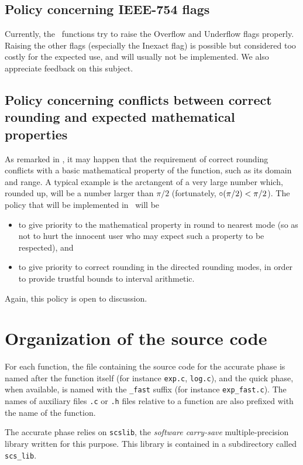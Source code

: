 \subsection{Policy concerning IEEE-754 flags}

Currently, the \crlibm\ functions try to raise the Overflow and
Underflow flags properly. Raising the other flags (especially the
Inexact flag) is possible but considered too costly for the expected
use, and will usually not be implemented. We also appreciate feedback
on this subject.

\subsection{Policy concerning conflicts between correct rounding and
  expected mathematical properties}
As remarked in \cite{DefHanLefMulRevZim2004}, it may happen that the
requirement of correct rounding conflicts with a basic mathematical
property of the function, such as its domain and range. A typical
example is the arctangent of a very large number which, rounded up,
will be a number larger than $\pi/2$ (fortunately, $\circ(\pi/2) <
\pi/2$). The policy that will be implemented in \crlibm\ will be
\begin{itemize}
\item to give priority to the mathematical property in round to
  nearest mode (so as not to hurt the innocent user who may expect
  such a property to be respected), and 
\item to give priority to correct rounding in the directed rounding
  modes, in order to provide trustful bounds to interval arithmetic.
\end{itemize}

Again, this policy is open to discussion.

\section{Organization of the source code}

For each function, the file containing the source code for the
accurate phase is named after the function itself (for instance
\texttt{exp.c}, \texttt{log.c}), and the quick phase, when available,
is named with the \texttt{\_fast} suffix (for instance
\texttt{exp\_fast.c}). The names of auxiliary files \texttt{.c} or
\texttt{.h} files relative to a function are also prefixed with the
name of the function.

The accurate phase relies on \texttt{scslib}, the \emph{software
  carry-save} multiple-precision library written for this purpose.
This library is contained in a subdirectory called \texttt{scs\_lib}.

